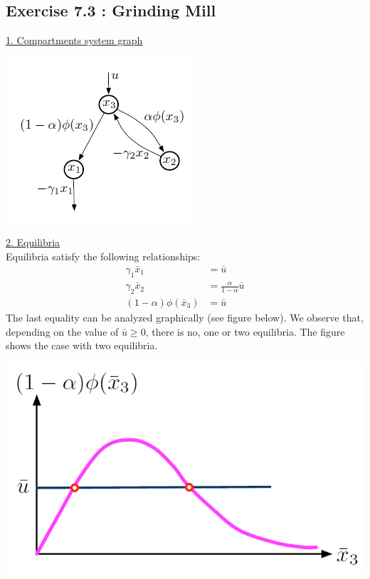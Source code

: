 \subsection*{Exercise 7.3 : Grinding Mill}
\underline{1. Compartments
system graph}

{\centering
\includegraphics[scale=0.7]{Graphe7_3_1}
\label{Graphe7_3_1}

}

\underline{2. Equilibria} \\
Equilibria satisfy the following relationships:
\begin{align*}
\gamma_1\bar{x}_1 &= \bar{u} \\
\gamma_2\bar{x}_2 &= \frac{\alpha }{1-\alpha }\bar{u} \\
(1-\alpha )\phi (\bar{x}_3) &= \bar{u}
\end{align*}
The last equality can be analyzed graphically (see figure below). We observe that, depending on the value of $\bar{u}\geq 0$, there is no, one or two equilibria. The figure shows the case with two equilibria.

{\centering
\includegraphics[scale=0.3]{Graphe7_3_2}
\label{Graphe7_3_2}
}

